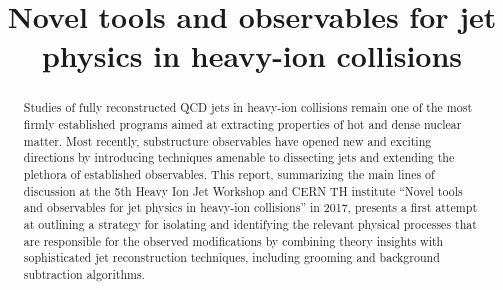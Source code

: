 \documentclass{article}
\begin{document}
\title{Novel tools and observables for jet physics in heavy-ion collisions}
%
%

\maketitle

\begin{abstract}
Studies of fully reconstructed QCD jets in heavy-ion collisions remain one of the most firmly established programs aimed at extracting properties of hot and dense nuclear matter. Most recently, substructure observables have opened new and exciting directions by introducing techniques amenable to dissecting jets and extending the plethora of established observables. This report, summarizing the main lines of discussion at the 5th Heavy Ion Jet Workshop and CERN TH institute ``Novel tools and observables for jet physics in heavy-ion collisions'' in 2017, presents a first attempt at outlining a strategy for isolating and identifying the relevant physical processes that are responsible for the observed modifications by combining theory insights with sophisticated jet reconstruction techniques, including grooming and background subtraction algorithms. 
\end{abstract}
\end{document}

